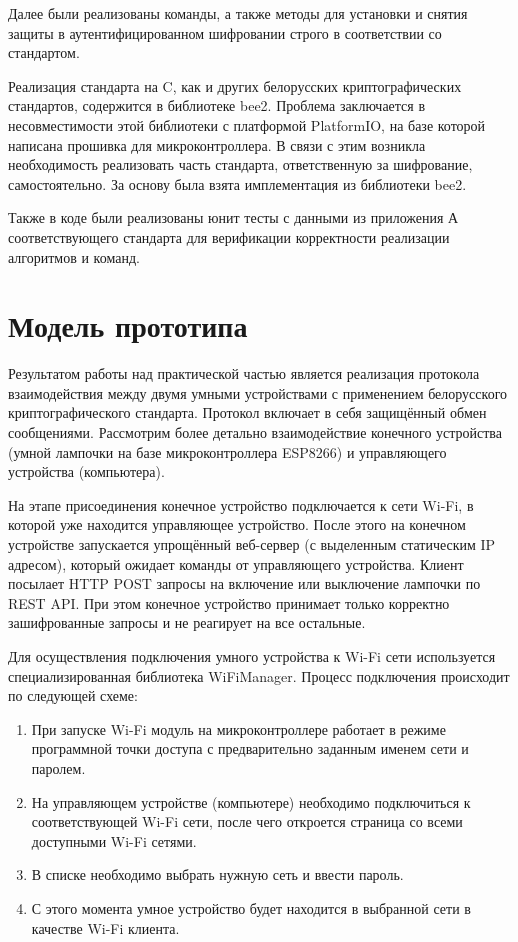 	Далее были реализованы команды, а также методы для установки и снятия защиты в аутентифицированном 
	шифровании строго в соответствии со стандартом.
	
	Реализация стандарта на C, как и других белорусских криптографических стандартов, содержится 
	в библиотеке bee2. Проблема заключается в несовместимости этой библиотеки с платформой PlatformIO,
	на базе которой написана прошивка для микроконтроллера. В связи с этим возникла необходимость
	реализовать часть стандарта, ответственную за шифрование, самостоятельно. За основу была взята
	имплементация из библиотеки bee2.
	
	Также в коде были реализованы юнит тесты с данными из приложения А соответствующего стандарта для
	верификации корректности реализации алгоритмов и команд.

	
	\section{Модель прототипа}
	
	Результатом работы над практической частью является реализация протокола взаимодействия между
	двумя умными устройствами с применением белорусского криптографического стандарта. Протокол
	включает в себя защищённый обмен сообщениями. Рассмотрим более детально взаимодействие конечного
	устройства (умной лампочки на базе микроконтроллера ESP8266) и управляющего устройства (компьютера).
	
	На этапе присоединения конечное устройство подключается к сети Wi-Fi, в которой уже находится
	управляющее устройство. После этого на конечном устройстве запускается упрощённый веб-сервер
	(с выделенным статическим IP адресом),
	который ожидает команды от управляющего устройства. Клиент посылает HTTP POST запросы на
	включение или выключение лампочки по REST API. При этом конечное устройство принимает только 
	корректно зашифрованные запросы и не реагирует на все остальные.
	
	Для осуществления подключения умного устройства к Wi-Fi сети используется специализированная
	библиотека WiFiManager. Процесс подключения происходит по следующей схеме:
	
	\begin{enumerate}
		\item При запуске Wi-Fi модуль на микроконтроллере работает в режиме программной точки доступа
		с предварительно заданным именем сети и паролем.
		\item На управляющем устройстве (компьютере) необходимо подключиться к соответствующей Wi-Fi сети, 
		после чего откроется страница со всеми доступными Wi-Fi сетями.
		\item В списке необходимо выбрать нужную сеть и ввести пароль.
		\item С этого момента умное устройство будет находится в выбранной сети в качестве Wi-Fi клиента.
	\end{enumerate}

